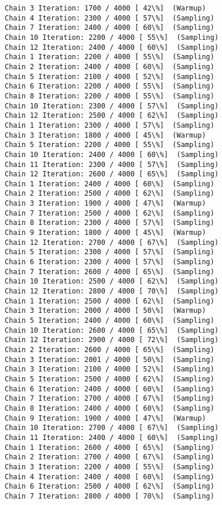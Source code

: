 \documentclass[11pt]{article}
\begin{document}
\begin{Verbatim}[commandchars=\\\{\}]
Chain 3 Iteration: 1700 / 4000 [ 42\%]  (Warmup)
Chain 4 Iteration: 2300 / 4000 [ 57\%]  (Sampling)
Chain 7 Iteration: 2400 / 4000 [ 60\%]  (Sampling)
Chain 10 Iteration: 2200 / 4000 [ 55\%]  (Sampling)
Chain 12 Iteration: 2400 / 4000 [ 60\%]  (Sampling)
Chain 1 Iteration: 2200 / 4000 [ 55\%]  (Sampling)
Chain 2 Iteration: 2400 / 4000 [ 60\%]  (Sampling)
Chain 5 Iteration: 2100 / 4000 [ 52\%]  (Sampling)
Chain 6 Iteration: 2200 / 4000 [ 55\%]  (Sampling)
Chain 8 Iteration: 2200 / 4000 [ 55\%]  (Sampling)
Chain 10 Iteration: 2300 / 4000 [ 57\%]  (Sampling)
Chain 12 Iteration: 2500 / 4000 [ 62\%]  (Sampling)
Chain 1 Iteration: 2300 / 4000 [ 57\%]  (Sampling)
Chain 3 Iteration: 1800 / 4000 [ 45\%]  (Warmup)
Chain 5 Iteration: 2200 / 4000 [ 55\%]  (Sampling)
Chain 10 Iteration: 2400 / 4000 [ 60\%]  (Sampling)
Chain 11 Iteration: 2300 / 4000 [ 57\%]  (Sampling)
Chain 12 Iteration: 2600 / 4000 [ 65\%]  (Sampling)
Chain 1 Iteration: 2400 / 4000 [ 60\%]  (Sampling)
Chain 2 Iteration: 2500 / 4000 [ 62\%]  (Sampling)
Chain 3 Iteration: 1900 / 4000 [ 47\%]  (Warmup)
Chain 7 Iteration: 2500 / 4000 [ 62\%]  (Sampling)
Chain 8 Iteration: 2300 / 4000 [ 57\%]  (Sampling)
Chain 9 Iteration: 1800 / 4000 [ 45\%]  (Warmup)
Chain 12 Iteration: 2700 / 4000 [ 67\%]  (Sampling)
Chain 5 Iteration: 2300 / 4000 [ 57\%]  (Sampling)
Chain 6 Iteration: 2300 / 4000 [ 57\%]  (Sampling)
Chain 7 Iteration: 2600 / 4000 [ 65\%]  (Sampling)
Chain 10 Iteration: 2500 / 4000 [ 62\%]  (Sampling)
Chain 12 Iteration: 2800 / 4000 [ 70\%]  (Sampling)
Chain 1 Iteration: 2500 / 4000 [ 62\%]  (Sampling)
Chain 3 Iteration: 2000 / 4000 [ 50\%]  (Warmup)
Chain 5 Iteration: 2400 / 4000 [ 60\%]  (Sampling)
Chain 10 Iteration: 2600 / 4000 [ 65\%]  (Sampling)
Chain 12 Iteration: 2900 / 4000 [ 72\%]  (Sampling)
Chain 2 Iteration: 2600 / 4000 [ 65\%]  (Sampling)
Chain 3 Iteration: 2001 / 4000 [ 50\%]  (Sampling)
Chain 3 Iteration: 2100 / 4000 [ 52\%]  (Sampling)
Chain 5 Iteration: 2500 / 4000 [ 62\%]  (Sampling)
Chain 6 Iteration: 2400 / 4000 [ 60\%]  (Sampling)
Chain 7 Iteration: 2700 / 4000 [ 67\%]  (Sampling)
Chain 8 Iteration: 2400 / 4000 [ 60\%]  (Sampling)
Chain 9 Iteration: 1900 / 4000 [ 47\%]  (Warmup)
Chain 10 Iteration: 2700 / 4000 [ 67\%]  (Sampling)
Chain 11 Iteration: 2400 / 4000 [ 60\%]  (Sampling)
Chain 1 Iteration: 2600 / 4000 [ 65\%]  (Sampling)
Chain 2 Iteration: 2700 / 4000 [ 67\%]  (Sampling)
Chain 3 Iteration: 2200 / 4000 [ 55\%]  (Sampling)
Chain 4 Iteration: 2400 / 4000 [ 60\%]  (Sampling)
Chain 6 Iteration: 2500 / 4000 [ 62\%]  (Sampling)
Chain 7 Iteration: 2800 / 4000 [ 70\%]  (Sampling)

\end{Verbatim}
\end{document}
